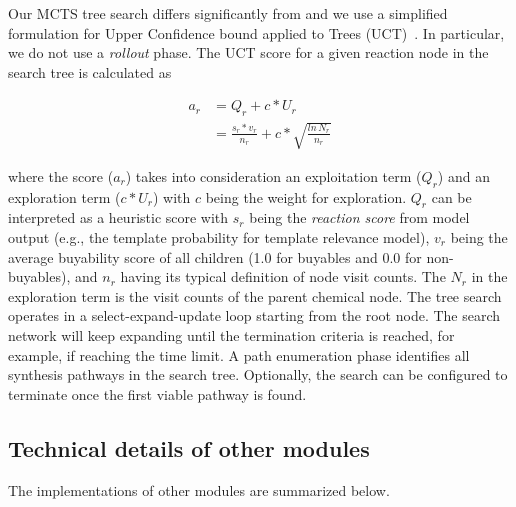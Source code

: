 \documentclass[pdflatex,sn-mathphys-num]{sn-jnl}%
\theoremstyle{thmstyleone}%
\theoremstyle{thmstyletwo}%
\theoremstyle{thmstylethree}%
\begin{document}
Our MCTS tree search differs significantly from \citet{segler_planning_2018} and we use a simplified formulation for Upper Confidence bound applied to Trees (UCT)~\citep{kocsis_bandit_2006}. In particular, we do not use a \emph{rollout} phase. The UCT score for a given reaction node in the search tree is calculated as

\begin{align}
    a_r &= Q_r + c * U_r \\
    &= \frac{s_r * v_r}{n_r} + c * \sqrt{\frac{ln\,N_r}{n_r}}
\end{align}

where the score ($a_r$) takes into consideration an exploitation term ($Q_r$) and an exploration term ($c*U_r$) with $c$ being the weight for exploration. $Q_r$ can be interpreted as a heuristic score with $s_r$ being the \emph{reaction score} from model output (e.g., the template probability for template relevance model), $v_r$ being the average buyability score of all children (1.0 for buyables and 0.0 for non-buyables), and $n_r$ having its typical definition of node visit counts. The $N_r$ in the exploration term is the visit counts of the parent chemical node. The tree search operates in a select-expand-update loop starting from the root node. The search network will keep expanding until the termination criteria is reached, for example, if reaching the time limit. A path enumeration phase identifies all synthesis pathways in the search tree. Optionally, the search can be configured to terminate once the first viable pathway is found.

\subsection{Technical details of other modules}

The implementations of other modules are summarized below.
\end{document}
